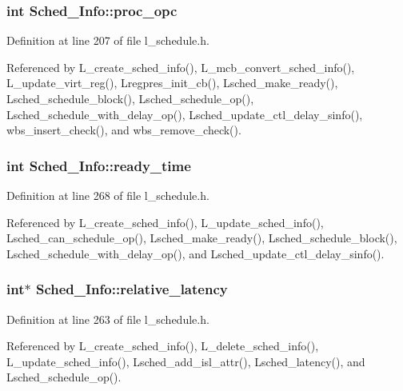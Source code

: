 \subsubsection{\setlength{\rightskip}{0pt plus 5cm}int \bf{Sched\_\-Info::proc\_\-opc}}\label{structSched__Info_9db1f9fdee24e1f908f4ff62a36bedde}




Definition at line 207 of file l\_\-schedule.h.

Referenced by L\_\-create\_\-sched\_\-info(), L\_\-mcb\_\-convert\_\-sched\_\-info(), L\_\-update\_\-virt\_\-reg(), Lregpres\_\-init\_\-cb(), Lsched\_\-make\_\-ready(), Lsched\_\-schedule\_\-block(), Lsched\_\-schedule\_\-op(), Lsched\_\-schedule\_\-with\_\-delay\_\-op(), Lsched\_\-update\_\-ctl\_\-delay\_\-sinfo(), wbs\_\-insert\_\-check(), and wbs\_\-remove\_\-check().
\subsubsection{\setlength{\rightskip}{0pt plus 5cm}int \bf{Sched\_\-Info::ready\_\-time}}\label{structSched__Info_a0decb6432e5f04ad6c8478402f18b7c}




Definition at line 268 of file l\_\-schedule.h.

Referenced by L\_\-create\_\-sched\_\-info(), L\_\-update\_\-sched\_\-info(), Lsched\_\-can\_\-schedule\_\-op(), Lsched\_\-make\_\-ready(), Lsched\_\-schedule\_\-block(), Lsched\_\-schedule\_\-with\_\-delay\_\-op(), and Lsched\_\-update\_\-ctl\_\-delay\_\-sinfo().
\subsubsection{\setlength{\rightskip}{0pt plus 5cm}int$\ast$ \bf{Sched\_\-Info::relative\_\-latency}}\label{structSched__Info_9a7146f1394576ce3da081788c4e63e1}




Definition at line 263 of file l\_\-schedule.h.

Referenced by L\_\-create\_\-sched\_\-info(), L\_\-delete\_\-sched\_\-info(), L\_\-update\_\-sched\_\-info(), Lsched\_\-add\_\-isl\_\-attr(), Lsched\_\-latency(), and Lsched\_\-schedule\_\-op().
